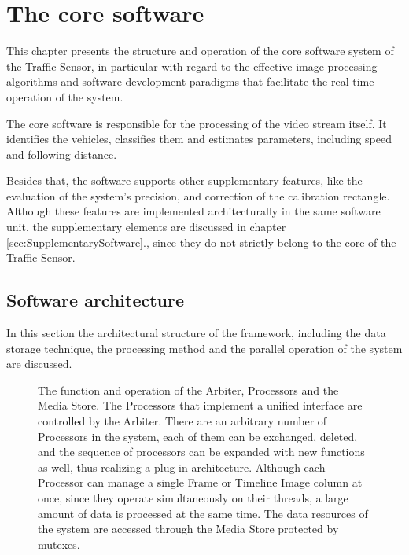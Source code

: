 \chapter{The core software}\label{chap:Core software}
This chapter presents the structure and operation of the core software system of the Traffic Sensor, in particular with regard to the effective image processing algorithms and software development paradigms that facilitate the real-time operation of the system.

The core software is responsible for the processing of the video stream itself.
It identifies the vehicles, classifies them and estimates parameters, including speed and following distance.
 
Besides that, the software supports other supplementary features, like the evaluation of the system's precision, and correction of the calibration rectangle.
Although these features are implemented architecturally in the same software unit, the supplementary elements are discussed in chapter \ref{sec:SupplementarySoftware}., since they do not strictly belong to the core of the Traffic Sensor.
\section{Software architecture}
In this section the architectural structure of the framework, including the data storage technique, the processing method and the parallel operation of the system are discussed.

\begin{figure}[!h]
	\centering
	
	\caption{The function and operation of the Arbiter, Processors and the Media Store. The Processors that implement a unified interface are controlled by the Arbiter. There are an arbitrary number of Processors in the system, each of them can be exchanged, deleted, and the sequence of processors can be expanded with new functions as well, thus realizing a plug-in architecture. Although each Processor can manage a single Frame or Timeline Image column at once, since they operate simultaneously on their threads, a large amount of data is processed at the same time. The data resources of the system are accessed through the Media Store protected by mutexes.\label{fig:arbiter_pipeline}}
\end{figure}

